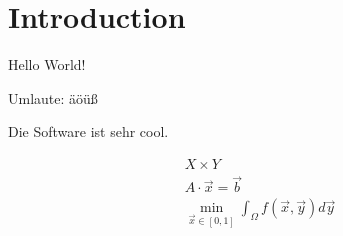 
\chapter{Introduction}

Hello World!

Umlaute: äöüß

Die Software \sgpp ist sehr cool.

\begin{gather}
  X \times Y\\
  A \cdot \vec{x} = \vec{b}\\
  \min_{\vec{x} \in [0, 1]} \int_\Omega f(\vec{x}, \vec{y}) d\vec{y}
\end{gather}

\blindmathpaper
